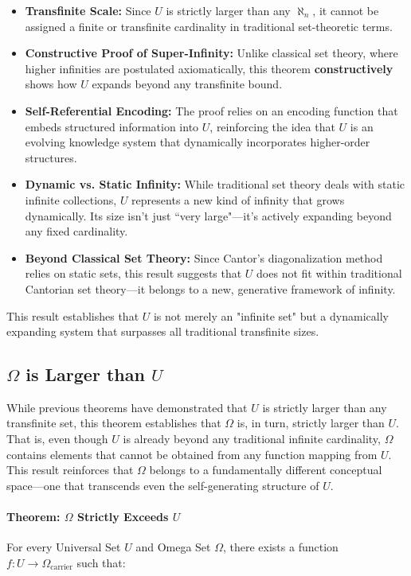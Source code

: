 \documentclass[12pt]{article}
\begin{document}
\begin{itemize}
    \item \textbf{Transfinite Scale:} Since \( U \) is strictly larger than any \( \aleph_n \), it cannot be assigned a finite or transfinite cardinality in traditional set-theoretic terms.
    \item \textbf{Constructive Proof of Super-Infinity:} Unlike classical set theory, where higher infinities are postulated axiomatically, this theorem \textbf{constructively} shows how \( U \) expands beyond any transfinite bound.
    \item \textbf{Self-Referential Encoding:} The proof relies on an encoding function that embeds structured information into \( U \), reinforcing the idea that \( U \) is an evolving knowledge system that dynamically incorporates higher-order structures.
    \item \textbf{Dynamic vs. Static Infinity:} While traditional set theory deals with static infinite collections, \( U \) represents a new kind of infinity that grows dynamically. Its size isn't just ``very large"—it's actively expanding beyond any fixed cardinality.
    \item \textbf{Beyond Classical Set Theory:} Since Cantor’s diagonalization method relies on static sets, this result suggests that \( U \) does not fit within traditional Cantorian set theory—it belongs to a new, generative framework of infinity.
\end{itemize}

This result establishes that \( U \) is not merely an "infinite set" but a dynamically expanding system that surpasses all traditional transfinite sizes.


\subsection{\( \Omega \) is Larger than \( U \)}

While previous theorems have demonstrated that \( U \) is strictly larger than any transfinite set, this theorem establishes that \( \Omega \) is, in turn, strictly larger than \( U \). That is, even though \( U \) is already beyond any traditional infinite cardinality, \( \Omega \) contains elements that cannot be obtained from any function mapping from \( U \). This result reinforces that \( \Omega \) belongs to a fundamentally different conceptual space—one that transcends even the self-generating structure of \( U \).

\paragraph{Theorem: \( \Omega \) Strictly Exceeds \( U \)}
For every Universal Set \( U \) and Omega Set \( \Omega \), there exists a function \( f: U \to \Omega_{\text{carrier}} \) such that:
\end{document}
